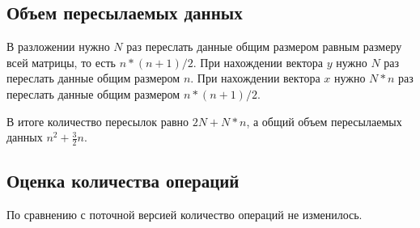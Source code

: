 \documentclass[a4paper, 12pt]{article}
\begin{document}
\subsection{Объем пересылаемых данных}
В разложении нужно $N$ раз переслать данные общим размером равным
размеру всей матрицы, то есть $n*(n+1)/2$.
При нахождении вектора $y$ нужно $N$ раз переслать данные общим размером
$n$.
При нахождении вектора $x$ нужно $N * n$ раз переслать данные общим размером
$n*(n+1)/2$.

В итоге количество пересылок равно $2N+N*n$, а общий объем 
пересылаемых данных $n^2 + \frac{3}{2}n$.
\subsection{Оценка количества операций}
По сравнению с поточной версией количество операций не изменилось.
\end{document}
